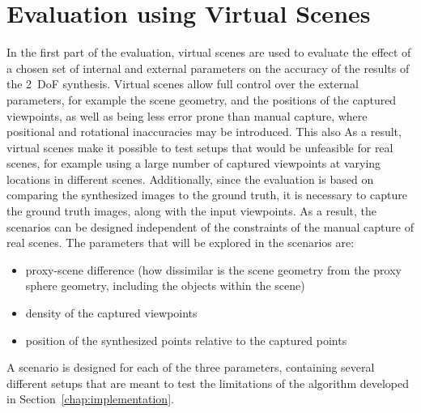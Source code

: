 \section{Evaluation using Virtual Scenes} \label{sec:limit_eval}
In the first part of the evaluation, virtual scenes are used to evaluate the effect of a chosen set of internal and external parameters on the accuracy of the results of the 2~DoF synthesis.
Virtual scenes allow full control over the external parameters, for example the scene geometry, and the positions of the captured viewpoints, as well as being less error prone than manual capture, where positional and rotational inaccuracies may be introduced. This also 
As a result, virtual scenes make it possible to test setups that would be unfeasible for real scenes, for example using a large number of captured viewpoints at varying locations in different scenes.
Additionally, since the evaluation is based on comparing the synthesized images to the ground truth, it is necessary to capture the ground truth images, along with the input viewpoints.
As a result, the scenarios can be designed independent of the constraints of the manual capture of real scenes.
The parameters that will be explored in the scenarios are:
\begin{itemize}
  \item proxy-scene difference (how dissimilar is the scene geometry from the proxy sphere geometry, including the objects within the scene)
  \item density of the captured viewpoints
  \item position of the synthesized points relative to the captured points
\end{itemize}

A scenario is designed for each of the three parameters, containing several different setups that are meant to test the limitations of the algorithm developed in Section~\ref{chap:implementation}. 


